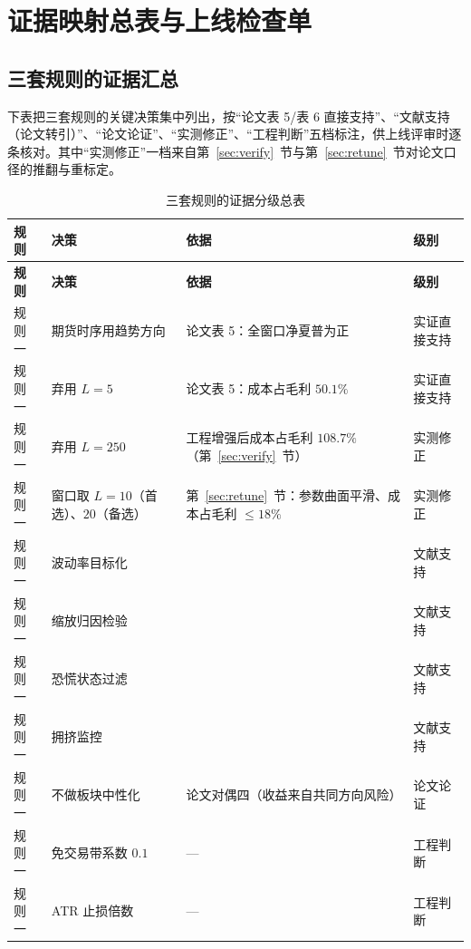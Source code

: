 \section{证据映射总表与上线检查单}\label{sec:mapping}

\subsection{三套规则的证据汇总}

下表把三套规则的关键决策集中列出，按“论文表 5/表 6 直接支持”、“文献支持（论文转引）”、“论文论证”、“实测修正”、“工程判断”五档标注，供上线评审时逐条核对。其中“实测修正”一档来自第~\ref{sec:verify}~节与第~\ref{sec:retune}~节对论文口径的推翻与重标定。

\begin{longtable}{@{}>{\raggedright\arraybackslash}p{2.4cm}>{\raggedright\arraybackslash}p{4.6cm}>{\raggedright\arraybackslash}p{4.4cm}>{\raggedright\arraybackslash}p{2.6cm}@{}}
\caption{三套规则的证据分级总表}\label{tab:allmap}\\
\toprule
\textbf{规则} & \textbf{决策} & \textbf{依据} & \textbf{级别} \\
\midrule
\endfirsthead
\toprule
\textbf{规则} & \textbf{决策} & \textbf{依据} & \textbf{级别} \\
\midrule
\endhead
\bottomrule
\endlastfoot
规则一 & 期货时序用趋势方向 & 论文表 5：全窗口净夏普为正 & 实证直接支持 \\
规则一 & 弃用 $L=5$ & 论文表 5：成本占毛利 $50.1\%$ & 实证直接支持 \\
规则一 & 弃用 $L=250$ & 工程增强后成本占毛利 $108.7\%$（第~\ref{sec:verify}~节） & 实测修正 \\
规则一 & 窗口取 $L=10$（首选）、$20$（备选） & 第~\ref{sec:retune}~节：参数曲面平滑、成本占毛利 $\le18\%$ & 实测修正 \\
规则一 & 波动率目标化 & \cite{barroso2015,harvey2018,moreiramuir2017} & 文献支持 \\
规则一 & 缩放归因检验 & \cite{kim2016,huang2020} & 文献支持 \\
规则一 & 恐慌状态过滤 & \cite{danielmoskowitz2016} & 文献支持 \\
规则一 & 拥挤监控 & \cite{stein2009,loupolk2022,baltas2019} & 文献支持 \\
规则一 & 不做板块中性化 & 论文对偶四（收益来自共同方向风险） & 论文论证 \\
规则一 & 免交易带系数 $0.1$ & — & 工程判断 \\
规则一 & ATR 止损倍数 & — & 工程判断 \\

\end{longtable}
